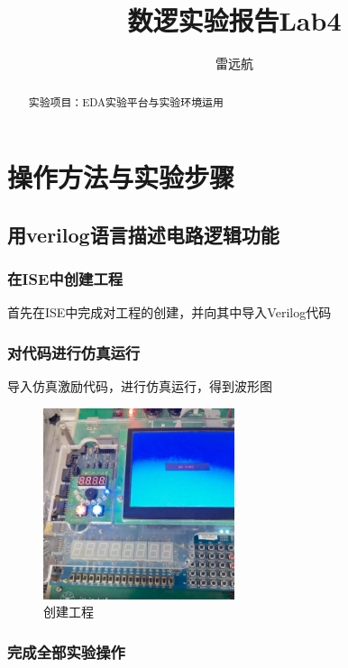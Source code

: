 \documentclass{article}
\title{数逻实验报告Lab4}
\author{雷远航}
\begin{document}
\maketitle

\begin{abstract}
实验项目：EDA实验平台与实验环境运用
\end{abstract}

\section{操作方法与实验步骤}

\subsection{用verilog语言描述电路逻辑功能}

\subsubsection{在ISE中创建工程}

首先在ISE中完成对工程的创建，并向其中导入Verilog代码


\subsubsection{对代码进行仿真运行}

导入仿真激励代码，进行仿真运行，得到波形图
\begin{figure}[H]
	\centering
	\includegraphics[width=0.5\textwidth]{1.jpg}
	\caption{\label{Lab4}创建工程}
	\end{figure}

\subsubsection{完成全部实验操作}
\end{document}
